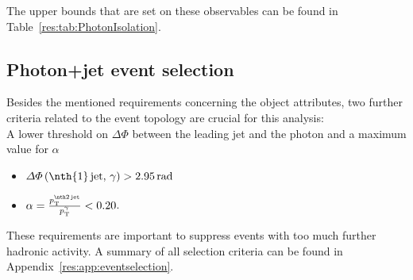 The upper bounds that are set on these observables can be found in Table~\ref{res:tab:PhotonIsolation}. 
\renewcommand{\arraystretch}{1.5}
\begin{table}[htb]
\centering
\caption{Upper bounds for all photon isolation criteria in the barrel $\left( |\eta^{\gamma}|<1.4442 \right)$.}
\label{res:tab:PhotonIsolation}
\end{table}

\subsection*{Photon+jet event selection}
Besides the mentioned requirements concerning the object attributes, two further criteria related to the event topology are crucial for this analysis:\\
A lower threshold on $\Delta \Phi$ between the leading jet and the photon and a maximum value for $\alpha$
\begin{itemize}
 \item $\Delta \Phi \left(\text{\nth{1}\,jet},\,\gamma \right) > 2.95\,\unit{rad}$
 \item $\alpha = \frac{\ptsecondjet}{\ptgamma} < 0.20$.
\end{itemize}
These requirements are important to suppress events with too much further hadronic activity.
A summary of all selection criteria can be found in Appendix~\ref{res:app:eventselection}.\\


